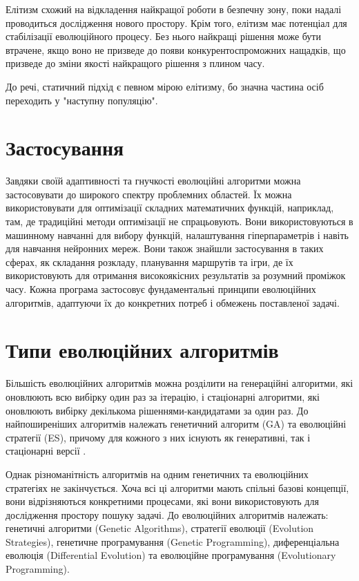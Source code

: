 Елітизм схожий на відкладення найкращої роботи в безпечну зону,
поки надалі проводиться дослідження нового простору.
Крім того, елітизм має потенціал для стабілізації
еволюційного процесу.
Без нього найкращі рішення може бути втрачене,
якщо воно не призведе до появи конкурентоспроможних нащадків,
що призведе до зміни якості найкращого рішення з плином часу. 

До речі, статичний підхід є певном мірою елітизму, бо значна частина
осіб переходить у "наступну популяцію".




\section{Застосування}

Завдяки своїй адаптивності та гнучкості еволюційні алгоритми можна 
застосовувати до широкого спектру проблемних областей. Їх можна 
використовувати для оптимізації складних математичних функцій, 
наприклад, там, де традиційні методи оптимізації не спрацьовують. 
Вони використовуються в машинному навчанні для вибору функцій, 
налаштування гіперпараметрів і навіть для навчання нейронних мереж. 
Вони також знайшли застосування в таких сферах, як складання розкладу, 
планування маршрутів та ігри, де їх використовують для отримання 
високоякісних результатів за розумний проміжок часу. 
Кожна програма застосовує фундаментальні принципи еволюційних алгоритмів, 
адаптуючи їх до конкретних потреб і обмежень поставленої задачі.

\section{Типи еволюційних алгоритмів}

Більшість еволюційних алгоритмів можна розділити на 
генераційні алгоритми, які оновлюють всю вибірку один раз за ітерацію,
і стаціонарні алгоритми, які оновлюють вибірку декількома рішеннями-кандидатами 
за один раз. 
До найпоширеніших алгоритмів належать генетичний алгоритм (GA) та 
еволюційні стратегії (ES), причому для кожного з них існують як генеративні,
так і стаціонарні версії \cite{lukeEssentialsMetaheuristicsSet2013}.

Однак різноманітність алгоритмів на одним генетичних та еволюційних
стратегіях не закінчується. 
Хоча всі ці алгоритми мають спільні базові концепції, 
вони відрізняються конкретними процесами, 
які вони використовують для дослідження простору пошуку задачі. 
До еволюційних алгоритмів належать:
генетичні алгоритми (Genetic Algorithms),
стратегії еволюції (Evolution Strategies),
генетичне програмування (Genetic Programming),
диференціальна еволюція (Differential Evolution) 
та еволюційне програмування (Evolutionary Programming).


